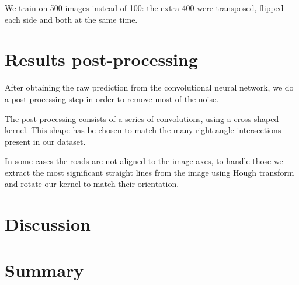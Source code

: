 \documentclass[11pt,conference,compsocconf]{IEEEtran}
\begin{document}
We train on 500 images instead of 100: the extra 400 were transposed, flipped each side and both at the same time.


\section{Results post-processing}
After obtaining the raw prediction from the convolutional neural network, we do a post-processing step in order to remove most of the noise.

The post processing consists of a series of convolutions, using a cross shaped kernel. This shape has be chosen to match the many right angle intersections present in our dataset.

In some cases the roads are not aligned to the image axes, to handle those we extract the most significant straight lines from the image using Hough transform and rotate our kernel to match their orientation.


\section{Discussion}


\section{Summary}
\end{document}
